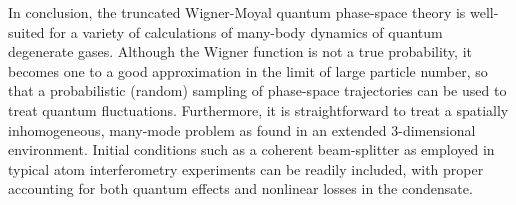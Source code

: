 \documentclass[doublecol]{epl2}
\begin{document}
In conclusion, the truncated Wigner-Moyal quantum phase-space theory is
well-suited for a variety of calculations of many-body dynamics of quantum degenerate gases.
Although the Wigner function is not a true probability, it becomes one
to a good approximation in the limit of large particle number, so that
a probabilistic (random) sampling of phase-space trajectories can be used
to treat quantum fluctuations.
Furthermore, it is straightforward to treat a spatially inhomogeneous,
many-mode problem as found in an extended 3-dimensional environment.
Initial conditions such as a coherent beam-splitter as employed in typical
atom interferometry experiments can be readily included,
with proper accounting for both quantum effects and nonlinear losses in the condensate.



\end{document}
